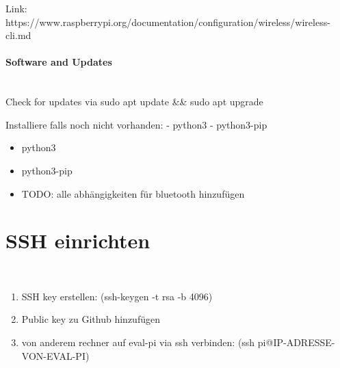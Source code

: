 Link: https://www.raspberrypi.org/documentation/configuration/wireless/wireless-cli.md

\paragraph{Software and Updates} \hspace{0pt} \\
Check for updates via sudo apt update \&\& sudo apt upgrade

Installiere falls noch nicht vorhanden:
- python3
- python3-pip 
\begin{itemize}
  \item python3
  \item python3-pip
  \item TODO: alle abhängigkeiten für bluetooth hinzufügen
\end{itemize}

\section{SSH einrichten} \hspace{0pt} \\

\begin{enumerate}
  \item SSH key erstellen: (ssh-keygen -t rsa -b 4096)
  \item Public key zu Github hinzufügen
  \item von anderem rechner auf eval-pi via ssh verbinden: (ssh pi@IP-ADRESSE-VON-EVAL-PI)
\end{enumerate}



